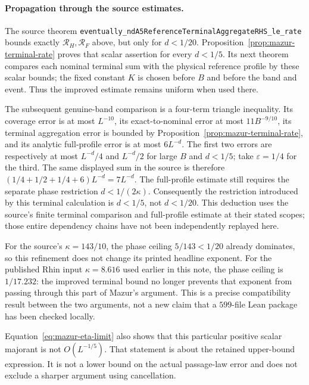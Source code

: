 \documentclass[11pt]{article}
\theoremstyle{remark}\newtheorem{remark}[proposition]{Remark}
\begin{document}
\paragraph{Propagation through the source estimates.}
The source theorem
\texttt{eventually\_ndA5ReferenceTerminalAggregateRHS\_le\_rate}
bounds exactly $\mathcal R_H,\mathcal R_F$ above, but only for
$d<1/20$. Proposition~\ref{prop:mazur-terminal-rate} proves
that scalar assertion for every $d<1/5$.
Its next theorem compares each nominal terminal sum with the
physical reference profile by these scalar bounds; the fixed
constant $K$ is chosen before $B$ and before the band and event.
Thus the improved estimate remains uniform when used there.

The subsequent genuine-band comparison is a four-term triangle
inequality. Its coverage error is at most $L^{-10}$,
its exact-to-nominal error at most $11B^{-9/10}$,
its terminal aggregation error is bounded by
Proposition~\ref{prop:mazur-terminal-rate}, and its analytic
full-profile error is at most $6L^{-d}$.
The first two errors are respectively at most
$L^{-d}/4$ and $L^{-d}/2$ for large $B$ and $d<1/5$;
take $\varepsilon=1/4$ for the third.
The same displayed sum in the source is therefore
$(1/4+1/2+1/4+6)L^{-d}=7L^{-d}$.
The full-profile estimate still requires the separate
phase restriction $d<1/(2\kappa)$.
Consequently the restriction introduced by this terminal
calculation is $d<1/5$, not $d<1/20$.
This deduction uses the source's finite terminal comparison
and full-profile estimate at their stated scopes; those entire
dependency chains have not been independently replayed here.

For the source's $\kappa=143/10$, the phase ceiling
$5/143<1/20$ already dominates, so this refinement does not
change its printed headline exponent. For the published Rhin
input $\kappa=8.616$ used earlier in this note, the phase ceiling
is $1/17.232$: the improved terminal bound no longer prevents
that exponent from passing through this part of Mazur's
argument. This is a precise compatibility result between the
two arguments, not a new claim that a $599$-file Lean package
has been checked locally.

Equation~\eqref{eq:mazur-eta-limit} also shows that this
particular positive scalar majorant is not $O(L^{-1/5})$.
That statement is about the retained upper-bound expression.
It is not a lower bound on the actual passage-law error and
does not exclude a sharper argument using cancellation.
\end{document}
